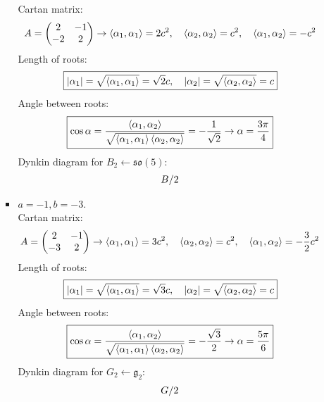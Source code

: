 \documentclass[12pt]{article}
\def\row#1/#2!{#1_{\IfStrEq{#2}{}{n}{#2}} & \dynkin{#1}{#2}\\}
\newcommand{\tble}[1]{
   \renewcommand*\do[1]{\row##1!}
   \[
      \begin{array}{ll}\docsvlist{#1}\end{array}
   \]
}
\theoremstyle{definition}
\begin{document}
\begin{enumerate}
\begin{itemize}
\begin{itemize}
            Cartan matrix:
            \begin{equation}
                A=\begin{pmatrix}
                    2 & -1\\
                    -2 & 2
                \end{pmatrix}\rightarrow\braket{\alpha_1,\alpha_1}=2c^2,\quad\braket{\alpha_2,\alpha_2}=c^2,\quad\braket{\alpha_1,\alpha_2}=-c^2
            \end{equation}
            Length of roots:
            \begin{equation}
                \boxed{|\alpha_1|=\sqrt{\braket{\alpha_1,\alpha_1}}=\sqrt{2}c,\quad|\alpha_2|=\sqrt{\braket{\alpha_2,\alpha_2}}=c}
            \end{equation}
            Angle between roots:
            \begin{equation}
                \boxed{\cos\alpha=\frac{\braket{\alpha_1,\alpha_2}}{\sqrt{\braket{\alpha_1,\alpha_1}\braket{\alpha_2,\alpha_2}}}=-\frac{1}{\sqrt{2}}\rightarrow\alpha=\frac{3\pi}{4}}
            \end{equation}
            Dynkin diagram for $B_2\leftarrow\mathfrak{so}(5)$: \tble{B/2}
            \item $a=-1, b=-3$.\\
            Cartan matrix:
            \begin{equation}
                A=\begin{pmatrix}
                    2 & -1\\
                    -3 & 2
                \end{pmatrix}\rightarrow\braket{\alpha_1,\alpha_1}=3c^2,\quad\braket{\alpha_2,\alpha_2}=c^2,\quad\braket{\alpha_1,\alpha_2}=-\frac{3}{2}c^2
            \end{equation}
            Length of roots:
            \begin{equation}
                \boxed{|\alpha_1|=\sqrt{\braket{\alpha_1,\alpha_1}}=\sqrt{3}c,\quad|\alpha_2|=\sqrt{\braket{\alpha_2,\alpha_2}}=c}
            \end{equation}
            Angle between roots:
            \begin{equation}
                \boxed{\cos\alpha=\frac{\braket{\alpha_1,\alpha_2}}{\sqrt{\braket{\alpha_1,\alpha_1}\braket{\alpha_2,\alpha_2}}}=-\frac{\sqrt{3}}{2}\rightarrow\alpha=\frac{5\pi}{6}}
            \end{equation}
            Dynkin diagram for $G_2\leftarrow\mathfrak{g}_2$: \tble{G/2}

\end{itemize}
\end{itemize}
\end{enumerate}
\end{document}
